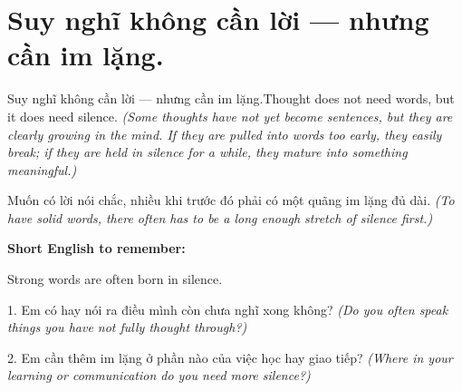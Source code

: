 \section{Suy nghĩ không cần lời — nhưng cần im lặng.}
\begin{truyen}{Suy nghĩ không cần lời — nhưng cần im lặng.}{Thought does not need words, but it does need silence.}
\textit{(Some thoughts have not yet become sentences, but they are clearly growing in the mind. If they are pulled into words too early, they easily break; if they are held in silence for a while, they mature into something meaningful.)}
\end{truyen}

\begin{baihoc}
Muốn có lời nói chắc, nhiều khi trước đó phải có một quãng im lặng đủ dài.
\textit{(To have solid words, there often has to be a long enough stretch of silence first.)}
\end{baihoc}

\begin{ghinhoanh}
\textbf{Short English to remember:}

Strong words are often born in silence.

\end{ghinhoanh}

\begin{tuhocnhanh}
1. Em có hay nói ra điều mình còn chưa nghĩ xong không? \textit{(Do you often speak things you have not fully thought through?)}

2. Em cần thêm im lặng ở phần nào của việc học hay giao tiếp? \textit{(Where in your learning or communication do you need more silence?)}
\end{tuhocnhanh}
\ngancach
